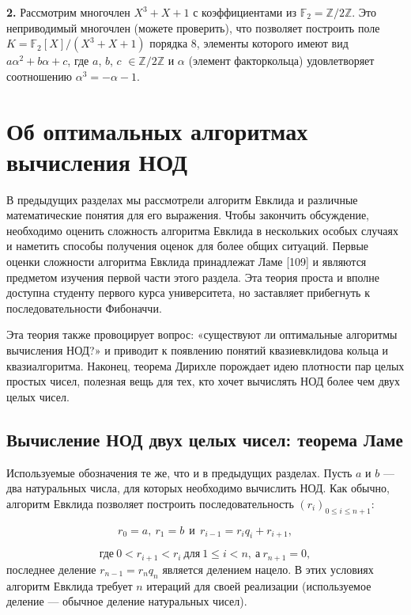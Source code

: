 \textbf{2.}  Рассмотрим многочлен $X^3 + X + 1$ с коэффициентами из 
$\mathbb{F}_2 = \mathbb{Z}\slash 2\mathbb{Z}$. Это неприводимый многочлен (можете проверить), что  
позволяет построить поле $K = \mathbb{F}_2[X]\slash(X^3 + X + 1)$ порядка 8, элементы 
которого имеют вид $a\alpha^2 + b\alpha + c$, где $a$, $b$, $c$ $\in \mathbb{Z}/2\mathbb{Z}$ и $\alpha$ (элемент 
факторкольца) удовлетворяет соотношению $\alpha^3 = -\alpha - 1$.\newline

\section{ Об оптимальных алгоритмах вычисления НОД}
В предыдущих разделах мы рассмотрели алгоритм Евклида и  
различные математические понятия для его выражения. Чтобы закончить 
обсуждение, необходимо оценить сложность алгоритма Евклида в  
нескольких особых случаях и наметить способы получения оценок для 
более общих ситуаций. Первые оценки сложности алгоритма Евклида 
принадлежат Ламе [109] и являются предметом изучения первой части 
этого раздела. Эта теория проста и вполне доступна студенту первого 
курса университета, но заставляет прибегнуть к последовательности 
Фибоначчи.
 
Эта теория также провоцирует вопрос: «существуют ли  
оптимальные алгоритмы вычисления НОД?» и приводит к появлению понятий 
квазиевклидова кольца и квазиалгоритма. Наконец, теорема Дирихле 
порождает идею плотности пар целых простых чисел, полезная вещь 
для тех, кто хочет вычислять НОД более чем двух целых чисел. 
 
\subsection{Вычисление НОД двух целых чисел: теорема Ламе}
Используемые обозначения те же, что и в предыдущих разделах. Пусть 
$a$ и $b$ — два натуральных числа, для которых необходимо вычислить 
НОД. Как обычно, алгоритм Евклида позволяет построить  
последовательность $(r_i)_{0 \leqslant i \leqslant n+1}$:

\begin{equation*}
r_0 = a,\: r_1 = b \:\: \text{и} \:\: r_{i-1} = r_i q_i + r_{i+1},
\end{equation*}
\pagebreak

\begin{equation*}
\text{где}\: 0 < r_{i+1} < r_i \: \text{для}\: 1 \leqslant i < n,\: \text{а}\: r_{n+1} = 0,
\end{equation*}
последнее деление $r_{n-1} = r_n q_n$ является делением нацело. В этих  
условиях алгоритм Евклида требует $n$ итераций для своей реализации 
(используемое деление — обычное деление натуральных чисел). 


